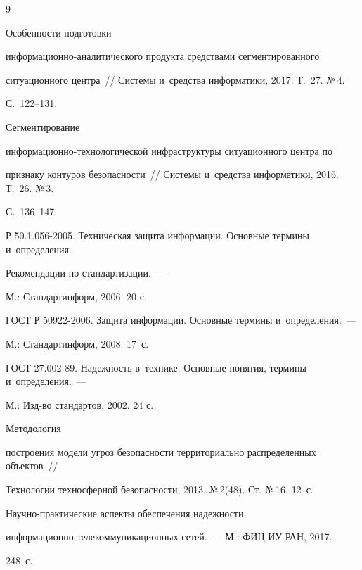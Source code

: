    {\small\frenchspacing

{%


\begin{thebibliography}{9}


 Особенности подготовки  

ин\-фор\-ма\-ци\-он\-но-ана\-ли\-ти\-че\-ско\-го продукта средствами сегментированного 

ситуационного цент\-ра~/\!\!/ Сис\-те\-мы и~средства информатики, 2017. Т.~27. №\,4.  

С.~122--131.


 Сегментирование  

ин\-фор\-ма\-ци\-он\-но-тех\-но\-ло\-ги\-че\-ской инфраструктуры ситуационного центра по 

признаку контуров без\-опас\-ности~/\!\!/ Сис\-те\-мы и~средства информатики, 2016. Т.~26. №\,3. 

С.~136--147.


Р 50.1.056-2005. Техническая защита информации. Основные термины и~определения. 

Рекомендации по стандартизации.~---

М.: Стандартинформ, 2006. 20 с.


ГОСТ Р 50922-2006. Защита информации. Основные термины и~определения.~---

М.: Стандартинформ, 2008. 17~с.


ГОСТ 27.002-89. Надежность в~технике. Основные понятия, термины и~определения.~---

М.: Изд-во стандартов, 2002. 24 с.


 Методология 

построения модели угроз безопас\-ности территориально распределенных объектов~/\!\!/ 

Технологии техносферной безопас\-ности, 2013. №\,2(48). Ст. №\,16. 12~с.



На\-уч\-но-прак\-ти\-че\-ские аспекты обеспечения на\-деж\-ности  

ин\-фор\-ма\-ци\-он\-но-те\-ле\-ком\-му\-ни\-ка\-ци\-он\-ных сетей.~--- М.: ФИЦ ИУ РАН, 2017. 

248~с. 

           \end{thebibliography}

} }



